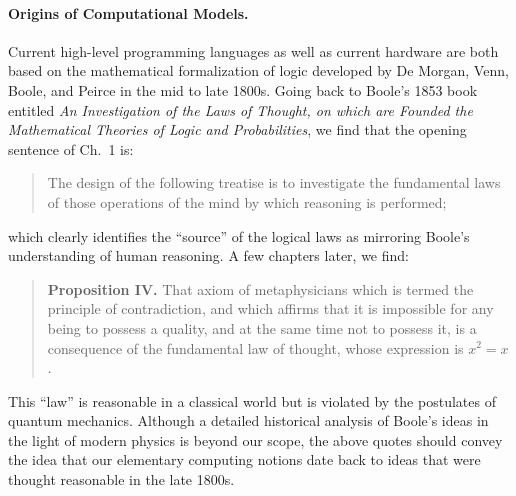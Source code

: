 \documentclass{article}
\begin{document}
\paragraph*{Origins of Computational Models.}
Current high-level programming languages as well as current hardware
are both based on the mathematical formalization of logic developed by
De Morgan, Venn, Boole, and Peirce in the mid to late 1800s. Going
back to Boole's 1853 book entitled \emph{An Investigation of the Laws
  of Thought, on which are Founded the Mathematical Theories of Logic
  and Probabilities}, we find that the opening sentence of Ch.~1 is:
\begin{quote}
  The design of the following treatise is to investigate the fundamental laws
  of those operations of the mind by which reasoning is performed;
\end{quote}
which clearly identifies the ``source'' of the logical laws as
mirroring Boole's understanding of human reasoning. A few chapters
later, we find:
\begin{quote}
  \textbf{Proposition IV.}  That axiom of metaphysicians which is termed the
  principle of contradiction, and which affirms that it is impossible for any
  being to possess a quality, and at the same time not to possess it, is a
  consequence of the fundamental law of thought, whose expression is $x^2 =
  x$.
\end{quote}
This ``law'' is reasonable in a classical world but is violated by the
postulates of quantum mechanics. Although a detailed historical
analysis of Boole's ideas in the light of modern physics is beyond our
scope, the above quotes should convey the idea that our elementary
computing notions date back to ideas that were thought reasonable in
the late 1800s.
\end{document}
